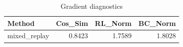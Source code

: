 \begin{table}[htbp]
\centering
\caption{Gradient diagnostics}
\label{tab:grad-diag}
\begin{tabular}{lrrr}
\toprule
\textbf{Method} & \textbf{Cos\_Sim} & \textbf{RL\_Norm} & \textbf{BC\_Norm} \\
\midrule
mixed\_replay & 0.8423 & 1.7589 & 1.8028 \\
\bottomrule
\end{tabular}
\end{table}